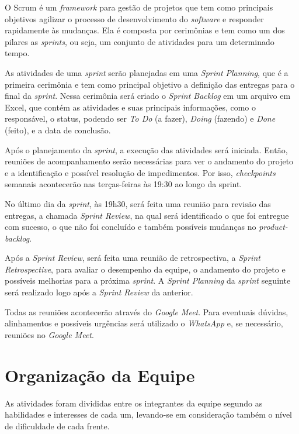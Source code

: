 \documentclass[
    12pt,               %
    openright,          %
    oneside,
    a4paper,            %
    paginasA3,  %
    english,            %
    brazil              %
    ]{ifsp-spo-inf-ctds} %
\begin{document}
O Scrum é um \textit{\gls{framework}} para gestão de projetos que tem como principais objetivos agilizar o processo de desenvolvimento do \textit{\gls{software}} e responder rapidamente às mudanças. Ela é composta por cerimônias e tem como um dos pilares as \textit{\glspl{sprint}}, ou seja, um conjunto de atividades para um determinado tempo. 


As atividades de uma \textit{\gls{sprint}} serão planejadas em uma \textit{Sprint Planning}, que é a primeira cerimônia e tem como principal objetivo a definição das entregas para o final da \textit{\gls{sprint}}. Nessa cerimônia será criado o \textit{Sprint Backlog} em um arquivo em Excel, que contém as atividades e suas principais informações, como o responsável, o status, podendo ser \textit{To Do} (a fazer), \textit{Doing} (fazendo) e \textit{Done} (feito), e a data de conclusão. 


Após o planejamento da \textit{\gls{sprint}}, a execução das atividades será iniciada. Então, reuniões de acompanhamento serão necessárias para ver o andamento do projeto e a identificação e possível resolução de impedimentos. Por isso, \textit{\glspl{checkpoint}} semanais acontecerão nas terças-feiras às 19:30 ao longo da sprint.

No último dia da \textit{\gls{sprint}}, às 19h30, será feita uma reunião para revisão das entregas, a chamada \textit{Sprint Review}, na qual será identificado o que foi entregue com sucesso, o que não foi concluído e também possíveis mudanças no \textit{\gls{product-backlog}}. 


Após a \textit{Sprint Review}, será feita uma reunião de retrospectiva, a \textit{Sprint Retrospective}, para avaliar o desempenho da equipe, o andamento do projeto e possíveis melhorias para a próxima \textit{\gls{sprint}}. A \textit{Sprint Planning} da \textit{\gls{sprint}} seguinte será realizado logo após a \textit{Sprint Review} da anterior.


Todas as reuniões acontecerão através do \textit{Google Meet}.
Para eventuais dúvidas, alinhamentos e possíveis urgências será utilizado o \textit{WhatsApp} e, se necessário, reuniões no \textit{Google Meet}. 


\section{Organização da Equipe}
As atividades foram divididas entre os integrantes da equipe segundo as habilidades e interesses de cada um, levando-se em consideração também o nível de dificuldade de cada frente.
\end{document}
